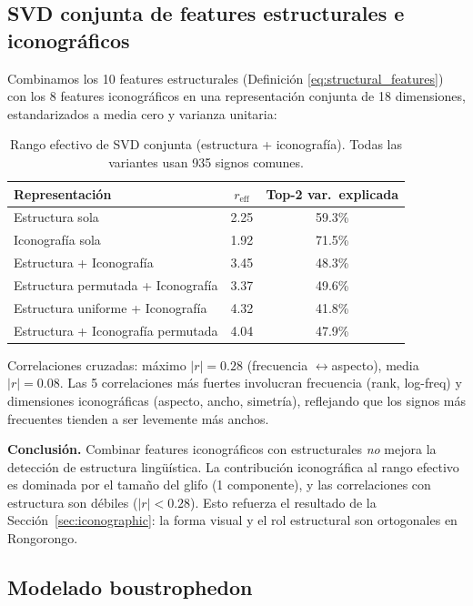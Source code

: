 \documentclass[11pt,a4paper]{article}
\newcommand{\1}{\mathbf{1}}
\numberwithin{equation}{section}
\begin{document}
\subsection{SVD conjunta de features estructurales e iconográficos}

Combinamos los 10 features estructurales (Definición \ref{eq:structural_features}) con los 8 features iconográficos en una representación conjunta de 18 dimensiones, estandarizados a media cero y varianza unitaria:

\begin{table}[h]
\centering
\caption{Rango efectivo de SVD conjunta (estructura + iconografía). Todas las variantes usan 935 signos comunes.}
\label{tab:joint_svd}
\begin{tabular}{lcc}
\toprule
Representación & $r_{\text{eff}}$ & Top-2 var.\ explicada \\
\midrule
Estructura sola & 2.25 & 59.3\% \\
Iconografía sola & 1.92 & 71.5\% \\
Estructura + Iconografía & 3.45 & 48.3\% \\
Estructura permutada + Iconografía & 3.37 & 49.6\% \\
Estructura uniforme + Iconografía & 4.32 & 41.8\% \\
Estructura + Iconografía permutada & 4.04 & 47.9\% \\
\bottomrule
\end{tabular}
\end{table}

Correlaciones cruzadas: máximo $|r|=0.28$ (frecuencia $\leftrightarrow$aspecto), media $|r|=0.08$. Las 5 correlaciones más fuertes involucran frecuencia (rank, log-freq) y dimensiones iconográficas (aspecto, ancho, simetría), reflejando que los signos más frecuentes tienden a ser levemente más anchos.

\textbf{Conclusión.} Combinar features iconográficos con estructurales \emph{no} mejora la detección de estructura lingüística. La contribución iconográfica al rango efectivo es dominada por el tamaño del glifo (1 componente), y las correlaciones con estructura son débiles ($|r| < 0.28$). Esto refuerza el resultado de la Sección~\ref{sec:iconographic}: la forma visual y el rol estructural son ortogonales en Rongorongo.

\subsection{Modelado boustrophedon}
\end{document}
